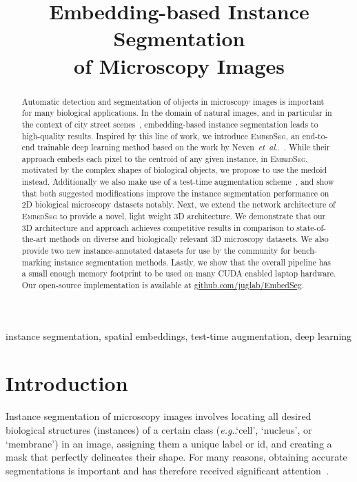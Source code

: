 \documentclass{midl}
\title[Embedding-based Instance Segmentation of Microscopy Images]{Embedding-based Instance Segmentation \\of Microscopy Images}
\makeatletter
\newcommand{\EmbedSeg}{\mbox{\textsc{EmbedSeg}}\xspace}
\DeclareRobustCommand\onedot{\futurelet\@let@token\@onedot}
\def\@onedot{\ifx\@let@token.\else.\null\fi\xspace}
\def\eg{\emph{e.g}\onedot} \def\Eg{\emph{E.g}\onedot}
\def\etal{\emph{et~al}\onedot}
\makeatother
\begin{document}
\maketitle
\begin{abstract}
Automatic detection and segmentation of objects in microscopy images is important for many biological applications.
In the domain of natural images, and in particular in the context of city street scenes~\cite{Cordts2016Cityscapes}, embedding-based instance segmentation leads to high-quality results.
Inspired by this line of work, we introduce \EmbedSeg, an end-to-end trainable deep learning method based on the work by Neven~\etal~\cite{neven2019}. While their approach embeds each pixel to the centroid of any given instance, in \EmbedSeg, motivated by the complex shapes of biological objects, we propose to use the medoid instead.
Additionally we also make use of a test-time augmentation scheme~\cite{wang2019,stringer2020}, and show that both suggested modifications improve the instance segmentation performance on 2D biological microscopy datasets notably.
 Next, we extend the network architecture of \EmbedSeg to provide a novel, light weight 3D architecture. 
 We demonstrate that our 3D architecture and approach achieves competitive results in comparison to state-of-the-art methods on diverse and biologically relevant 3D microscopy datasets.
We also provide two new instance-annotated datasets for use by the community for bench-marking instance segmentation methods.
Lastly, we show that the overall pipeline has a small enough memory footprint to be used on many CUDA enabled laptop hardware.
Our open-source implementation is available at \url{github.com/juglab/EmbedSeg}.
\end{abstract}

\begin{keywords}
instance segmentation, spatial embeddings, test-time augmentation, deep learning
\end{keywords}

\section{Introduction}
\label{sec:intro}
Instance segmentation of microscopy images involves locating all desired biological structures (instances) of a certain class (\eg `cell', `nucleus', or `membrane') in an image, assigning them a unique label or id, and creating a mask that perfectly delineates their shape. 
For many reasons, obtaining accurate segmentations is important and has therefore received significant attention~\cite{mejering2012,caicedo2019_v2}.
\end{document}
